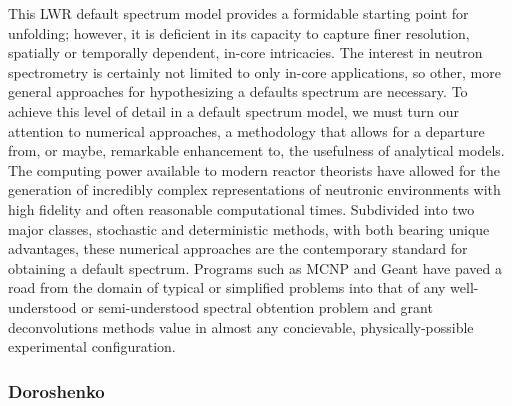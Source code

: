 This LWR default spectrum model provides a formidable starting point for unfolding; however, it is deficient in its capacity to capture finer resolution, spatially or temporally dependent, in-core intricacies.
The interest in neutron spectrometry is certainly not limited to only in-core applications, so other, more general approaches for hypothesizing a defaults spectrum are necessary.
To achieve this level of detail in a default spectrum model, we must turn our attention to numerical approaches, a methodology that allows for a departure from, or maybe, remarkable enhancement to, the usefulness of analytical models.
The computing power available to modern reactor theorists have allowed for the generation of incredibly complex representations of neutronic environments with high fidelity and often reasonable computational times.
Subdivided into two major classes, stochastic and deterministic methods, with both bearing unique advantages, these numerical approaches are the contemporary standard for obtaining a default spectrum.
Programs such as MCNP and Geant have paved a road from the domain of typical or simplified problems into that of any well-understood or semi-understood spectral obtention problem and grant deconvolutions methods value in almost any concievable, physically-possible experimental configuration.






\subsubsection{Doroshenko}


